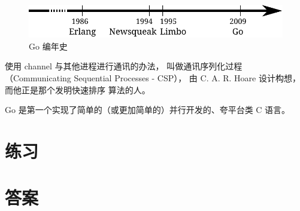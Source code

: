 \begin{figure}[H]
\caption{Go 编年史}
\label{fig:chrono-of-go}
\begin{center}
\includegraphics[scale=0.65]{fig/go-history.pdf}
\end{center}
\end{figure}

使用 channel 与其他进程进行通讯的办法，
叫做通讯序列化过程（Communicating Sequential Processes - CSP），
由 C. A. R. Hoare \cite{hoare} 设计构想，而他正是那个发明快速排序 \cite{Quicksort} 算法的人。

\begin{lbar}[]
Go 是第一个实现了简单的（或更加简单的）并行开发的、夸平台类 C 语言。
\end{lbar}

\section{练习}


\cleardoublepage
\section{答案}
\shipoutAnswer
